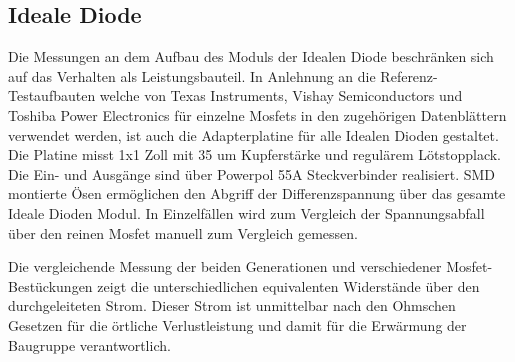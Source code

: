 \subsection{Ideale Diode}

Die Messungen an dem Aufbau des Moduls der Idealen Diode beschränken sich auf das Verhalten als Leistungsbauteil. 
In Anlehnung an die Referenz-Testaufbauten welche von Texas Instruments, Vishay Semiconductors und Toshiba Power Electronics für einzelne Mosfets in den zugehörigen Datenblättern verwendet werden, ist auch die Adapterplatine für alle Idealen Dioden gestaltet.
Die Platine misst 1x1 Zoll mit 35 um Kupferstärke und regulärem Lötstopplack. Die Ein- und Ausgänge sind über Powerpol 55A Steckverbinder realisiert. SMD montierte Ösen ermöglichen den Abgriff der Differenzspannung über das gesamte Ideale Dioden Modul. In Einzelfällen wird zum Vergleich der Spannungsabfall über den reinen Mosfet manuell zum Vergleich gemessen.

Die vergleichende Messung der beiden Generationen und verschiedener Mosfet-Bestückungen zeigt die unterschiedlichen equivalenten Widerstände über den durchgeleiteten Strom.
Dieser Strom ist unmittelbar nach den Ohmschen Gesetzen für die örtliche Verlustleistung und damit für die Erwärmung der Baugruppe verantwortlich.


\begin{comment}


\begin{figure}[H]
\begin{tikzpicture}
 \begin{axis}[
 	ymin=0,
    xmin=0,
 	width=\textwidth,height=0.5\textheight,
    xlabel={Testsrom [A]},
    ylabel={R-res [mOhm]},
    grid=major,
    legend entries={Ideale Diode Mini,Ideale Diode Mini mod.,},
    enlarge x limits=0.01,
]
 	\addplot+[mark=*] table[x=Teststrom1, y=Ideale_Diode_Mini1]  {graphen/Testdaten_Ideale_Dioden-Vergleich.txt};

 \end{axis}
\end{tikzpicture}
\caption{Einfahrzyklus Wegprofil (für jeden Zyklus ist ein Hub dargestellt)}
\label{Einfahrzyklus_Wegprofil}
\end{figure}


\end{comment}



